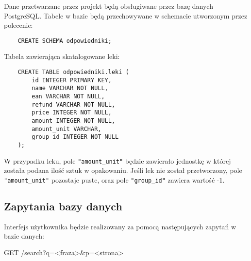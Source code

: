 \documentclass{article}
\begin{document}
Dane przetwarzane przez projekt będą obsługiwane przez bazę danych PostgreSQL. Tabele w bazie będą przechowywane w schemacie utworzonym przez polecenie:
\begin{verbatim}
    CREATE SCHEMA odpowiedniki;
\end{verbatim}
Tabela zawierająca skatalogowane leki:
    \begin{verbatim}
    CREATE TABLE odpowiedniki.leki (
        id INTEGER PRIMARY KEY,
        name VARCHAR NOT NULL,
        ean VARCHAR NOT NULL,
        refund VARCHAR NOT NULL,
        price INTEGER NOT NULL,
        amount INTEGER NOT NULL,
        amount_unit VARCHAR,
        group_id INTEGER NOT NULL
    );
    \end{verbatim}
W przypadku leku, pole \verb|"amount_unit"| będzie zawierało jednostkę w której została podana ilość sztuk w opakowaniu. 
Jeśli lek nie został przetworzony, pole \verb|"amount_unit"| pozostaje puste, oraz pole \verb|"group_id"| zawiera wartość -1.

\subsection{Zapytania bazy danych}

Interfejs użytkownika będzie realizowany za pomocą następujących zapytań w bazie danych: \newline

\centerline{GET /search?q=<fraza>&p=<strona>}
\end{document}
